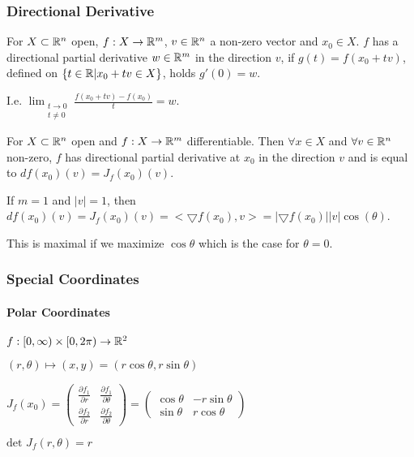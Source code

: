 \subsubsection{Directional Derivative}
For $X \subset \mathbb{R}^n$ open, $f: X \to \mathbb{R}^m$, $v \in \mathbb{R}^n$ a non-zero vector and $x_0 \in X$. $f$ has a directional partial derivative $w \in \mathbb{R}^m$ in the direction $v$, if $g(t) = f(x_0 + tv)$, defined on $\{t \in \mathbb{R} | x_0 + tv \in X\}$, holds $g'(0) = w$.

\begin{compactitem}
    \item I.e. $\lim_{\substack{t \to 0\\ t \neq 0}} \frac{f(x_0 + tv) - f(x_0)}{t} = w$.
\end{compactitem}

For $X \subset \mathbb{R}^n$ open and $f: X \to \mathbb{R}^m$ differentiable. Then $\forall x \in X$ and $\forall v \in \mathbb{R}^n$ non-zero, $f$ has directional partial derivative at $x_0$ in the direction $v$ and is equal to $df(x_0) (v) = J_f(x_0)(v)$.

\begin{compactitem}
\item If $m = 1$ and $|v| = 1$, then $df(x_0) (v) = J_f(x_0)(v) = <\bigtriangledown f(x_0), v> = |\bigtriangledown f(x_0)||v|\cos(\theta)$.
    \begin{compactitem}
        \item This is maximal if we maximize $\cos \theta$ which is the case for $\theta = 0$.
    \end{compactitem}
\end{compactitem}

\subsubsection{Special Coordinates}
\paragraph{Polar Coordinates}
\begin{inparaitem}
    \item $f: [0, \infty) \times [0, 2\pi) \to \mathbb{R}^2$
    \item $(r, \theta) \mapsto (x, y) = (r \cos \theta, r \sin \theta)$
    \item $J_f(x_0) = 
        \begin{pmatrix}
            \frac{\partial f_1}{\partial r} & \frac{\partial f_1}{\partial \theta}\\
            \frac{\partial f_2}{\partial r} & \frac{\partial f_2}{\partial \theta}
        \end{pmatrix} = 
        \begin{pmatrix}
            \cos \theta & -r \sin \theta\\
            \sin \theta & r \cos \theta
        \end{pmatrix}$
    \item $\text{det }J_f(r, \theta) = r$
\end{inparaitem}

